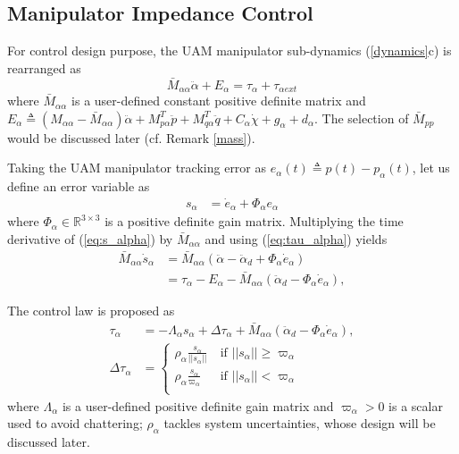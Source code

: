 \documentclass[letterpaper, 10 pt, conference]{ieeeconf}  %
\begin{document}
\subsection{Manipulator Impedance Control}
For control design purpose, the UAM manipulator sub-dynamics (\ref{dynamics}c) is rearranged as
\begin{equation} \label{dynamics_q}
\bar{M}_{\alpha\alpha}\ddot{\alpha} + E_{\alpha} = \tau_{\alpha}   + \tau_{\alpha{ext}}    
\end{equation}
where $\bar{M}_{\alpha\alpha}$ is a user-defined constant positive definite matrix and $E_\alpha \triangleq (M_{\alpha\alpha} - \bar{M}_{\alpha\alpha})\ddot{\alpha} + M_{p\alpha}^T\ddot{p} + M_{q\alpha}^T\ddot{q} + C_\alpha\dot{\chi} + g_\alpha + d_\alpha $. The selection of $\bar{M}_{pp}$ would be discussed later (cf. Remark \ref{mass}).

Taking the UAM manipulator tracking error as $e_\alpha(t) \triangleq p(t) - p_\alpha(t)$, let us define an error variable as
\begin{align}
     s_\alpha &= \dot{e}_\alpha + \Phi_\alpha e_\alpha \label{eq:s_alpha}
 \end{align}
where $\Phi_{\alpha} \in \mathbb{R}^{3 \times 3}$ is a positive definite gain matrix. Multiplying the time derivative of (\ref{eq:s_alpha}) by $\bar{M}_{\alpha\alpha}$ and  using (\ref{eq:tau_alpha}) yields
\begin{align}
\bar{M}_{\alpha\alpha} \dot{s}_\alpha &= \bar{M}_{\alpha\alpha}(\ddot{\alpha}- \ddot{\alpha}_d+ \Phi_{\alpha} {\dot{e}_\alpha}) \nonumber \\ 
&= {\tau_{\alpha}}- {E}_{\alpha} - \bar{M}_{\alpha\alpha}(\ddot{\alpha}_d- \Phi_{\alpha} {\dot{e}_\alpha}), \label{eq:salpha_dot}
\end{align}


The control law is proposed as
\begin{subequations}\label{ct3}
\begin{align}
\tau_{\alpha} &= -\Lambda_{\alpha} s_\alpha + \Delta \tau_{\alpha} + \bar{M}_{\alpha\alpha}(\ddot{\alpha}_d- \Phi_{\alpha} {\dot{e}_\alpha}),  \label{tau_alpha}\\
\Delta \tau_{\alpha} &= \begin{cases}
    \rho_{\alpha} \frac{s_{\alpha}}{||s_{\alpha}||}       & ~ \text{if } || s_{\alpha}|| \geq \varpi_\alpha\\
    \label{del_alpha}
    \rho_{\alpha} \frac{s_{\alpha}}{\varpi_\alpha}       & ~ \text{if } || s_{\alpha}|| < \varpi_\alpha\\
    \end{cases}
\end{align}
\end{subequations}
where $\Lambda_{\alpha}$ is a user-defined positive definite gain matrix and $\varpi_{\alpha} > 0$ is a scalar used to avoid chattering; $\rho_{\alpha}$ tackles system uncertainties, whose design will be discussed later.
\end{document}
